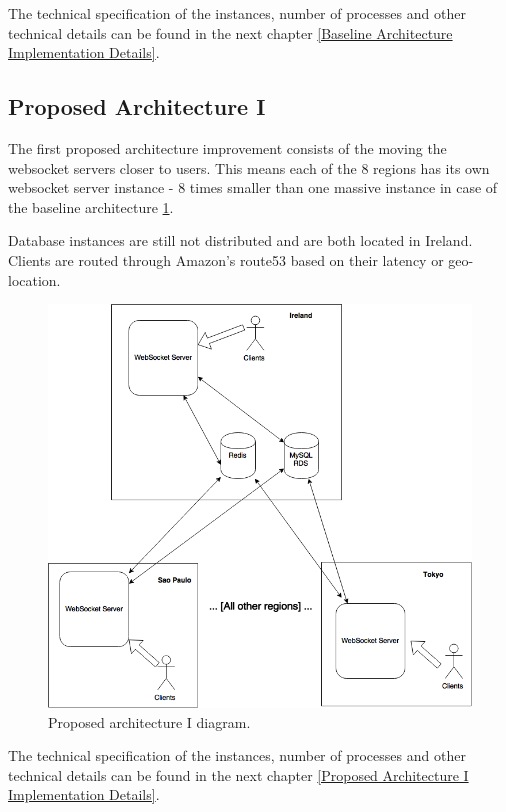 \documentclass{uvamscse}
\begin{document}
The technical specification of the instances, number of processes and other technical details can be found in the next chapter \ref{Baseline Architecture Implementation Details}.

\subsection{Proposed Architecture I}\label{Proposed Architecture I}
The first proposed architecture improvement consists of the moving the websocket servers closer to users. This means each of the 8 regions has its own websocket server instance - 8 times smaller than one massive instance in case of the baseline architecture \ref{figure:archprop1}.

Database instances are still not distributed and are both located in Ireland. Clients are routed through Amazon's route53 based on their latency or geo-location.

\begin{figure}[H]
\centering
\includegraphics[scale=0.3]{archprop1}
\caption{Proposed architecture I diagram.}
\label{figure:archprop1}
\end{figure}

The technical specification of the instances, number of processes and other technical details can be found in the next chapter \ref{Proposed Architecture I Implementation Details}.
\end{document}
